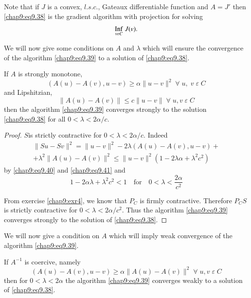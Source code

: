 Note that if $J$ is a convex, $l.s.c.$, Gateaux differentiable function
and $A=J'$ then \eqref{chap9:eq9.38} is the gradient algorithm with
projection for solving 
$$
\underset{v\varepsilon C}{\operatorname{Inf}}\; J(v).
$$

We will now give some conditions on $A$ and $\lambda$ which will
ensure the convergence of the algorithm \eqref{chap9:eq9.39} to a
solution of \eqref{chap9:eq9.38}.

\setcounter{THM}{8}
\begin{THM}\label{chap9:THM9}
If $A$ is strongly monotone, \ie
\begin{equation}\label{chap9:eq9.40}
(A(u)-A(v),u-v)\geq\alpha\parallel u-v\parallel^2 \;\forall \;u, \;v
\;\varepsilon \;C
\end{equation}
and Lipshitzian,
\begin{equation}\label{chap9:eq9.41}
\parallel A(u)-A(v)\parallel\leq c\parallel u-v\parallel \;\forall
\;u, v\;\varepsilon \;C
\end{equation}
then the algorithm \eqref{chap9:eq9.39} converges strongly to the
solution \eqref{chap9:eq9.38} for all $0<\lambda < 2\alpha/c$.
\end{THM}

\begin{proof}
$S$\pageoriginale is strictly contractive for
  $0<\lambda<2\alpha/c$. Indeed 
\begin{align*}
\parallel Su-Sv\parallel^2=\parallel u-v\parallel^2-2\lambda(A(u)-
A(v), u-v)+\\
+\lambda^2\parallel A(u)-A(v)\parallel^2\leq\parallel u-v\parallel^2
(1-2\lambda \alpha +\lambda^2c^2)
\end{align*}
by \eqref{chap9:eq9.40} and \eqref{chap9:eq9.41} and 
$$
1-2\alpha\lambda +\lambda^2c^2<1\quad\text{for}\quad 0<\lambda <
\frac{2\alpha}{c^2}
$$

From exercise \ref{chap9:exr4}, we know that $P_C$ is firmly
contractive. Therefore $P_CS$ is strictly contractive for $0<\lambda
<2\alpha/c^2$. Thus the algorithm \eqref{chap9:eq9.39} converges
strongly to the solution of \eqref{chap9:eq9.38}.
\end{proof}

We will now give a condition on $A$ which will imply weak convergence
of the algorithm \eqref{chap9:eq9.39}.

\begin{THM}\label{chap9:THM10}
If $A^{-1}$ is coercive, namely
\begin{equation}\label{chap9:eq9.42}
(A(u)-A(v),u-v)\geq\alpha\parallel A(u)-A(v)\parallel^2\;\forall \;u,v
\;\varepsilon \;C
\end{equation}
then for $0<\lambda <2\alpha$ the algorithm \eqref{chap9:eq9.39}
converges weakly to a solution of \eqref{chap9:eq9.38}.
\end{THM}

